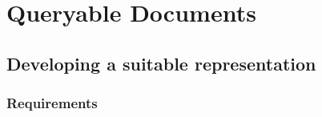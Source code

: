 \chapter{Queryable Documents}\label{ch:queries}

\section{Developing a suitable representation}\label{sec:queries-representation}

\subsection{Requirements}\label{subsec:queries-requirements}
